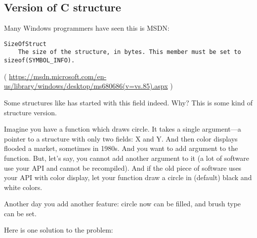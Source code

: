 \subsection{Version of C structure}

Many Windows programmers have seen this is MSDN:

\begin{lstlisting}
SizeOfStruct
    The size of the structure, in bytes. This member must be set to sizeof(SYMBOL_INFO).
\end{lstlisting}

( \url{https://msdn.microsoft.com/en-us/library/windows/desktop/ms680686(v=vs.85).aspx} )

Some structures like  has started with this field indeed. Why?
This is some kind of structure version.

Imagine you have a function which draws circle.
It takes a single argument---a pointer to a structure with only two fields: X and Y.
And then color displays flooded a market, sometimes in 1980s. And you want to add  argument to the function.
But, let's say, you cannot add another argument to it (a lot of software use your \ac{API} and cannot be recompiled).
And if the old piece of software uses your \ac{API} with color display,
let your function draw a circle in (default) black and white colors.

Another day you add another feature: circle now can be filled, and brush type can be set.

Here is one solution to the problem:

